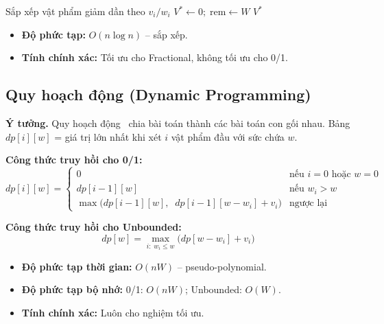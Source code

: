 \begin{algorithm}[H]
\caption{Tham lam cho Fractional Knapsack}
\label{alg:greedy_frac}
Sắp xếp vật phẩm giảm dần theo $v_i / w_i$\;
$V^* \leftarrow 0;\; \text{rem} \leftarrow W$\;
\Return $V^*$\;
\end{algorithm}

\begin{itemize}[noitemsep]
    \item \textbf{Độ phức tạp:} $O(n \log n)$ -- sắp xếp.
    \item \textbf{Tính chính xác:} Tối ưu cho Fractional, không tối ưu cho 0/1.
\end{itemize}

\subsection{Quy hoạch động (Dynamic Programming)}

\textbf{Ý tưởng.} Quy hoạch động~\cite{bellman1957dynamic} chia bài toán thành các bài toán con gối nhau. Bảng $dp[i][w]$ = giá trị lớn nhất khi xét $i$ vật phẩm đầu với sức chứa $w$.

\textbf{Công thức truy hồi cho 0/1:}
\begin{equation}
dp[i][w] = \begin{cases}
0 & \text{nếu } i = 0 \text{ hoặc } w = 0 \\
dp[i-1][w] & \text{nếu } w_i > w \\
\max\big(dp[i-1][w],\;\; dp[i-1][w-w_i] + v_i\big) & \text{ngược lại}
\end{cases}
\label{eq:dp01}
\end{equation}

\textbf{Công thức truy hồi cho Unbounded:}
\begin{equation}
dp[w] = \max_{i:\; w_i \leq w} \big(dp[w-w_i] + v_i\big)
\label{eq:dpub}
\end{equation}

\begin{itemize}[noitemsep]
    \item \textbf{Độ phức tạp thời gian:} $O(nW)$ -- pseudo-polynomial.
    \item \textbf{Độ phức tạp bộ nhớ:} 0/1: $O(nW)$; Unbounded: $O(W)$.
    \item \textbf{Tính chính xác:} Luôn cho nghiệm tối ưu.
\end{itemize}

